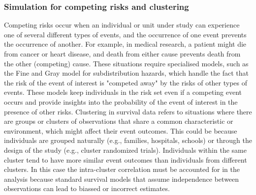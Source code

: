 \subsubsection{Simulation for competing risks and clustering}
Competing risks occur when an individual or unit under study can experience one of several different types of events, and the occurrence of one event prevents the occurrence of another. For example, in medical research, a patient might die from cancer or heart disease, and death from either cause prevents death from the other (competing) cause. These situations require specialised models, such as the Fine and Gray model \parencite{meng_simulating_2023} for subdistribution hazards, which handle the fact that the risk of the event of interest is "competed away" \parencite{meng_simulating_2023} by the risks of other types of events. These models keep individuals in the risk set even if a competing event occurs and provide insights into the probability of the event of interest in the presence of other risks. Clustering in survival data refers to situations where there are groups or clusters of observations that share a common characteristic or environment, which might affect their event outcomes. This could be because individuals are grouped naturally (e.g., families, hospitals, schools) or through the design of the study (e.g., cluster randomized trials). Individuals within the same cluster tend to have more similar event outcomes than individuals from different clusters. In this case the intra-cluster correlation must be accounted for in the analysis because standard survival models that assume independence between observations can lead to biassed or incorrect estimates.
